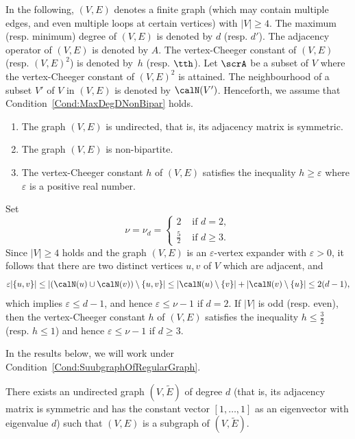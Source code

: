 In the following, $(V, E)$ denotes a finite graph (which may contain multiple edges, and even multiple loops at certain vertices) with $|V| \geq 4$. The maximum (resp. minimum) degree of $(V, E)$ is denoted by $d$ (resp. $d'$). The adjacency operator of $(V, E)$ is denoted by $A$. The vertex-Cheeger constant of $(V, E)$ (resp. $(V, E)^2$) is denoted by~$h$ (resp. $\tth$). Let $\scrA$ be a subset of $V$ where the vertex-Cheeger constant of $(V, E)^2$ is attained. The neighbourhood of a subset $V'$ of $V$ in $(V, E)$ is denoted by $\calN(V')$. Henceforth, we assume that Condition~\ref{Cond:MaxDegDNonBipar} holds. 
\begin{condition}
\label{Cond:MaxDegDNonBipar}
\quad 
\begin{enumerate}
\item 
The graph $(V, E)$ is undirected, that is, its adjacency matrix is symmetric. 
\item The graph $(V, E)$ is non-bipartite. 
\item The vertex-Cheeger constant $h$ of $(V, E)$ satisfies the inequality $h\geq  \varepsilon$ where $\varepsilon$ is a positive real  number. 
\end{enumerate}
\end{condition}
Set
$$
\nu = \nu_d
= 
\begin{cases}
2 & \text{ if } d = 2, \\
\frac 52 & \text{ if } d\geq 3.
\end{cases}
$$
Since $|V|\geq 4$ holds and the graph $(V, E)$ is an $\varepsilon$-vertex expander with $\varepsilon>0$, it follows that there are two distinct vertices $u, v$ of $V$ which are adjacent, and 
$$
\varepsilon |\{u, v\}|
 \leq |(\calN(u) \cup \calN(v) ) \setminus \{u, v\}| 
 \leq |\calN(u) \setminus \{v\}| + |\calN(v)\setminus \{u\}|
 \leq 2(d-1),
$$
which implies $\varepsilon \leq d-1$, and hence $\varepsilon \leq \nu -1$ if $d = 2$. If $|V|$ is odd (resp. even), then the vertex-Cheeger constant $h$ of $(V, E)$ satisfies the inequality $h \leq \frac 32$ (resp. $h \leq 1$) and hence $\varepsilon \leq \nu -1$ if $d\geq 3$. 

In the results below, we will work under Condition~\ref{Cond:SuubgraphOfRegularGraph}. 

\begin{condition}
\label{Cond:SuubgraphOfRegularGraph}
There exists an undirected graph $(V, \widetilde E)$ of degree $d$ (that is, its adjacency matrix is symmetric and has the constant vector $[1, \ldots, 1]$ as an eigenvector with eigenvalue $d$) such that $(V, E)$ is a subgraph of $(V, \widetilde E)$. 
\end{condition}

